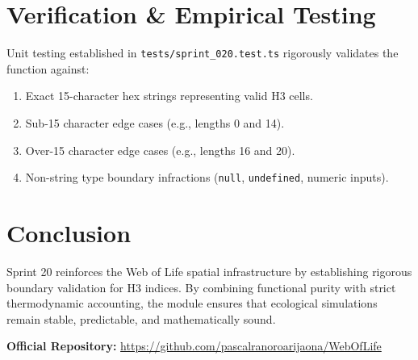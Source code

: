 \documentclass[11pt, a4paper]{article}
\begin{document}
\section{Verification \& Empirical Testing}
Unit testing established in \texttt{tests/sprint\_020.test.ts} rigorously validates the function against:
\begin{enumerate}
    \item Exact 15-character hex strings representing valid H3 cells.
    \item Sub-15 character edge cases (e.g., lengths 0 and 14).
    \item Over-15 character edge cases (e.g., lengths 16 and 20).
    \item Non-string type boundary infractions (\texttt{null}, \texttt{undefined}, numeric inputs).
\end{enumerate}

\section{Conclusion}
Sprint 20 reinforces the Web of Life spatial infrastructure by establishing rigorous boundary validation for H3 indices. By combining functional purity with strict thermodynamic accounting, the module ensures that ecological simulations remain stable, predictable, and mathematically sound.

\vspace{1em}
\noindent\textbf{Official Repository:} \url{https://github.com/pascalranoroarijaona/WebOfLife}
\end{document}
